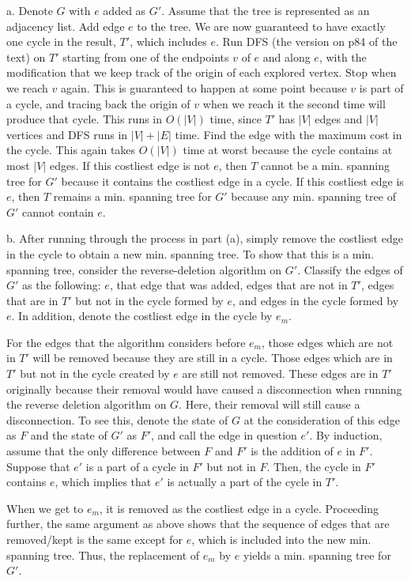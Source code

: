 \documentclass{article}
\begin{document}
a. Denote $G$ with $e$ added as $G'$. Assume that the tree is represented as an adjacency list. Add edge $e$ to the tree. We are now guaranteed to have exactly one cycle in the result, $T'$, which includes $e$. Run DFS (the version on p84 of the text) on $T'$ starting from one of the endpoints $v$ of $e$ and along $e$, with the modification that we keep track of the origin of each explored vertex. Stop when we reach $v$ again. This is guaranteed to happen at some point because $v$ is part of a cycle, and tracing back the origin of $v$ when we reach it the second time will produce that cycle. This runs in $O(|V|)$ time, since $T'$ has $|V|$ edges and $|V|$ vertices and DFS runs in $|V|+|E|$ time. Find the edge with the maximum cost in the cycle. This again takes $O(|V|)$ time at worst because the cycle contains at most $|V|$ edges. If this costliest edge is not $e$, then $T$ cannot be a min. spanning tree for $G'$ because it contains the costliest edge in a cycle. If this costliest edge is $e$, then $T$ remains a min. spanning tree for $G'$ because any min. spanning tree of $G'$ cannot contain $e$.

b. After running through the process in part (a), simply remove the costliest edge in the cycle to obtain a new min. spanning tree. To show that this is a min. spanning tree, consider the reverse-deletion algorithm on $G'$. Classify the edges of $G'$ as the following: $e$, that edge that was added, edges that are not in $T'$, edges that are in $T'$ but not in the cycle formed by $e$, and edges in the cycle formed by $e$. In addition, denote the costliest edge in the cycle by $e_m$. 

For the edges that the algorithm considers before $e_m$, those edges which are not in $T'$ will be removed because they are still in a cycle. Those edges which are in $T'$ but not in the cycle created by $e$ are still not removed. These edges are in $T'$ originally because their removal would have caused a disconnection when running the reverse deletion algorithm on $G$. Here, their removal will still cause a disconnection. To see this, denote the state of $G$ at the consideration of this edge as $F$ and the state of $G'$ as $F'$, and call the edge in question $e'$. By induction, assume that the only difference between $F$ and $F'$ is the addition of $e$ in $F'$. Suppose that $e'$ is a part of a cycle in $F'$ but not in $F$. Then, the cycle in $F'$ contains $e$, which implies that $e'$ is actually a part of the cycle in $T'$. 

When we get to $e_m$, it is removed as the costliest edge in a cycle. Proceeding further, the same argument as above shows that the sequence of edges that are removed/kept is the same except for $e$, which is included into the new min. spanning tree. Thus, the replacement of $e_m$ by $e$ yields a min. spanning tree for $G'$.
\end{document}
